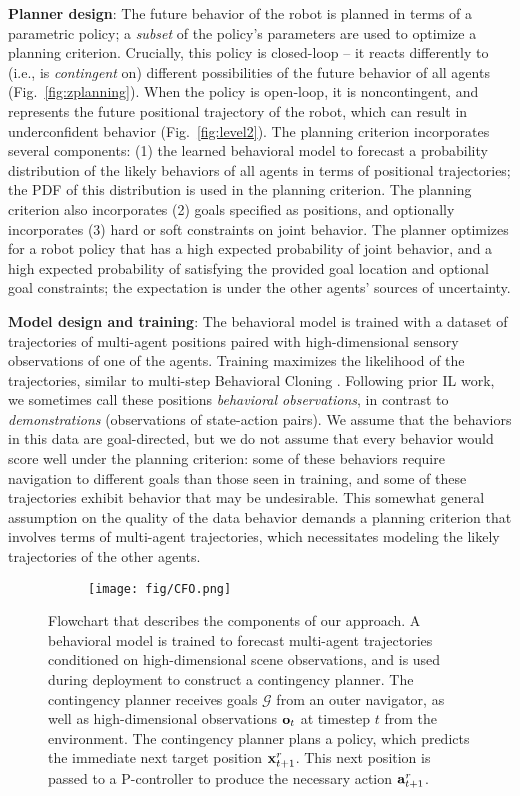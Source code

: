 \documentclass[conference]{IEEEtran}
\newcommand{\mypara}[1]{\vspace{1mm}\noindent\textbf{#1}:}
\begin{document}
\mypara{Planner design} The future behavior of the robot is planned in terms of a parametric policy; a \emph{subset} of the policy's parameters are used to optimize a planning criterion.
Crucially, this policy is closed-loop -- it reacts differently to (i.e., is \emph{contingent} on) different possibilities of the future behavior of all agents (Fig.~\ref{fig:zplanning}). When the policy is open-loop, it is noncontingent, and represents the future positional trajectory of the robot, which can result in underconfident behavior (Fig.~\ref{fig:level2}). The planning criterion incorporates several components: (1) the learned behavioral model
to forecast a probability distribution of the likely behaviors of all agents in terms of positional trajectories; the PDF of this distribution is used in the planning criterion. The planning criterion also incorporates (2) goals specified as positions, and optionally incorporates (3) hard or soft constraints on joint behavior. The planner optimizes for a robot policy that has a high expected probability of joint behavior, and a high expected probability of satisfying the provided goal location and optional goal constraints; the expectation is under the other agents' sources of uncertainty.

\mypara{Model design and training} The behavioral model is trained with a dataset of trajectories of multi-agent positions paired with high-dimensional sensory observations of one of the agents. Training maximizes the likelihood of the trajectories, similar to multi-step Behavioral Cloning \cite{pomerleau1989alvinn}. Following prior IL work, we sometimes call these positions \emph{behavioral observations}, in contrast to \emph{demonstrations} (observations of state-action pairs). We assume that the behaviors in this data are goal-directed, but we do not assume that every behavior would score well under the planning criterion: some of these behaviors require navigation to different goals than those seen in training, and some of these trajectories exhibit behavior
that may be undesirable. This somewhat general assumption on the quality of the data behavior demands a planning criterion that involves terms of multi-agent trajectories, which necessitates modeling the likely trajectories of the other agents. 

\begin{figure}
\centering
\begin{subfigure}[b]{\columnwidth}
\texttt{[image: fig/CFO.png]}
\end{subfigure}
\caption{\small Flowchart that describes the components of our approach. A behavioral model is trained to forecast multi-agent trajectories conditioned on high-dimensional scene observations, and is used during deployment to construct a contingency planner. The contingency planner receives goals $\mathcal{G}$ from an outer navigator, as well as high-dimensional observations $\mathbf{o}_t$ at timestep $t$ from the environment. The contingency planner plans a policy, which predicts the immediate next target position $\mathbf{x}_{t+1}^r$. This next position is passed to a P-controller to produce the necessary action $\mathbf{a}_{t+1}^r$.} \label{fig:method_overview}

\vspace{-2em}
\end{figure}
\end{document}
